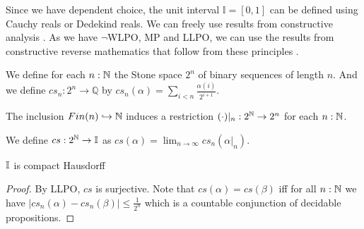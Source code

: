 Since we have dependent choice, the unit interval $\mathbb I = [0,1]$ can be defined using 
Cauchy reals or Dedekind reals. 
We can freely use results from constructive analysis \cite{Bishop}. 
As we have $\neg$WLPO, MP and LLPO, we can use the results from 
constructive reverse mathematics that follow from these principles \cite{ReverseMathsBishop, HannesDiener}. 
\begin{definition}
  We define for each $n:\mathbb{N}$ the Stone space $2^n$ of binary sequences of length $n$.
  And we define $cs_n:2^n \to \mathbb Q$ by 
  $cs_n(\alpha) = \sum_{i < n } \frac{\alpha(i)}{2^{i+1}}.$
\end{definition}
\begin{remark}
  The inclusion $Fin(n) \hookrightarrow \mathbb{N}$ induces a restriction 
  $(\cdot)|_n : 2^{\mathbb{N}} \to 2^n$ for each $n:\mathbb{N}$. 
\end{remark}
\begin{definition}
  We define $cs:2^{\mathbb{N}} \to \mathbb{I}$ as 
  $cs(\alpha) = \lim_{n\to\infty} cs_n(\alpha|_n)$. 
\end{definition}

\begin{theorem}
  $\mathbb{I}$ is compact Hausdorff
\end{theorem}
\begin{proof}
  By LLPO, $cs$ is surjective.   
  Note that $cs(\alpha) = cs(\beta)$ iff 
  for all $n:\mathbb{N}$ we have $|cs_n(\alpha)-cs_n(\beta)|\leq \frac{1}{2^n}$
  which is a countable conjunction of decidable propositions.
\end{proof}

